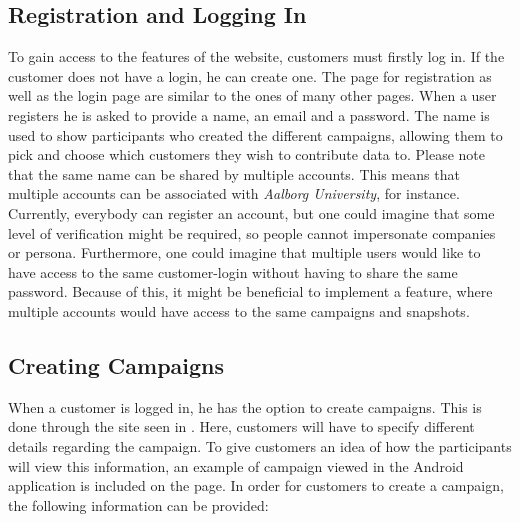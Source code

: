 \subsection{Registration and Logging In}

To gain access to the features of the website, customers must firstly log in. If the customer does not have a login, he can create one. The page for registration as well as the login page are similar to the ones of many other pages. When a user registers he is asked to provide a name, an email and a password. The name is used to show participants who created the different campaigns, allowing them to pick and choose which customers they wish to contribute data to. Please note that the same name can be shared by multiple accounts. This means that multiple accounts can be associated with \emph{Aalborg University}, for instance. Currently, everybody can register an account, but one could imagine that some level of verification might be required, so people cannot impersonate companies or persona. Furthermore, one could imagine that multiple users would like to have access to the same customer-login without having to share the same password. Because of this, it might be beneficial to implement a feature, where multiple accounts would have access to the same campaigns and snapshots.



\subsection{Creating Campaigns}
\label{sub:creating_campaign}

When a customer is logged in, he has the option to create campaigns. This is done through the site seen in . Here, customers will have to specify different details regarding the campaign. To give customers an idea of how the participants will view this information, an example of campaign viewed in the Android application is included on the page. In order for customers to create a campaign, the following information can be provided:

